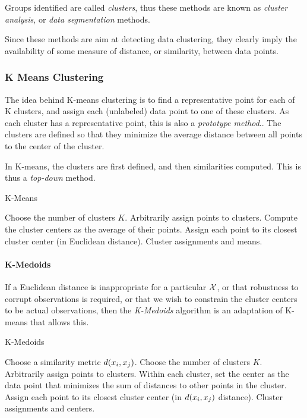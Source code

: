 Groups identified are called \emph{clusters}, thus these methods are known as \emph{cluster analysis}, or \emph{data segmentation} methods.

Since these methods are aim at detecting data clustering, they clearly imply the availability of some measure of distance, or similarity, between data points. 


\subsubsection{K Means Clustering}
\label{sec:kmeans}
The idea behind K-means clustering is to find a representative point for each of K clusters, and assign each (unlabeled) data point to one of these clusters. As each cluster has a representative point, this is also a \emph{prototype method}..
The clusters are defined so that they minimize the average distance between all points to the center of the cluster.

In K-means, the clusters are first defined, and then similarities computed. This is thus a \emph{top-down} method.

\begin{algorithm}[H]
\caption{K-Means}
\begin{algorithmic}
\State Choose the number of clusters $K$.
\State Arbitrarily assign points to clusters.
	\State Compute the cluster centers as the average of their points.
	\State Assign each point to its closest cluster center (in Euclidean distance).
\EndWhile
\State \Return Cluster assignments and means.
\end{algorithmic}
\end{algorithm}



\paragraph{K-Medoids}
If a Euclidean distance is inappropriate for a particular $\mathcal{X}$, or that robustness to corrupt observations is required, or that we wish to constrain the cluster centers to be actual observations, then the \emph{K-Medoids} algorithm is an adaptation of K-means that allows this.

\begin{algorithm}[H]
\caption{K-Medoids}
\begin{algorithmic}
\State Choose a similarity metric $d(x_i,x_j)$.
\State Choose the number of clusters $K$.
\State Arbitrarily assign points to clusters.
	\State Within each cluster, set the center as the data point that minimizes the sum of distances to other points in the cluster.
	\State Assign each point to its closest cluster center (in $d(x_i,x_j)$ distance).
\EndWhile
\State \Return Cluster assignments and centers.
\end{algorithmic}
\end{algorithm}


